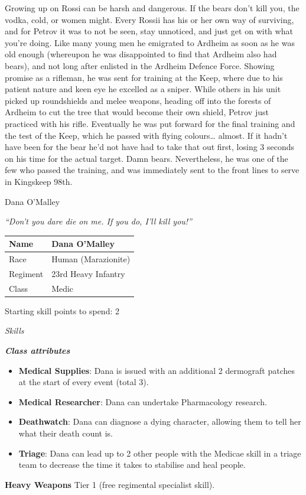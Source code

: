Growing up on Rossi can be harsh and dangerous. If the bears don't kill you, the vodka, cold, or women might. Every Rossii has his or her own way of surviving, and for Petrov it was to not be seen, stay unnoticed, and just get on with what you're doing. Like many young men he emigrated to Ardheim as soon as he was old enough (whereupon he was disappointed to find that Ardheim also had bears), and not long after enlisted in the Ardheim Defence Force. Showing promise as a rifleman, he was sent for training at the Keep, where due to his patient nature and keen eye he excelled as a sniper. While others in his unit picked up roundshields and melee weapons, heading off into the forests of Ardheim to cut the tree that would become their own shield, Petrov just practiced with his rifle. Eventually he was put forward for the final training and the test of the Keep, which he passed with flying colours{\dots} almost. If it hadn't have been for the bear he'd not have had to take that out first, losing 3 seconds on his time for the actual target. Damn bears. Nevertheless, he was one of the few who passed the training, and was immediately sent to the front lines to serve in Kingskeep 98th.

Dana O'Malley

\textit{``Don't you dare die on me. If you do, I'll kill you!''}

\begin{table}
\begin{tabular}{|l|l|} \hline 
Name & Dana O'Malley \\
 \hline Race & Human (Marazionite) \\
 \hline Regiment & 23rd Heavy Infantry \\
 \hline Class & Medic \\
 \hline \end{tabular}

\end{table}

Starting skill points to spend: 2

\textit{Skills}

\textbf{\textit{Class attributes}}

\begin{itemize}
\item \textbf{Medical Supplies}: Dana is issued with an additional 2 dermograft patches at the start of every event (total 3).

\item \textbf{Medical Researcher}: Dana can undertake Pharmacology research.

\item \textbf{Deathwatch}: Dana can diagnose a dying character, allowing them to tell her what their death count is.

\item \textbf{Triage}: Dana can lead up to 2 other people with the Medicae skill in a triage team to decrease the time it takes to stabilise and heal people.

\end{itemize}
\textbf{Heavy Weapons} Tier 1 (free regimental specialist skill).

